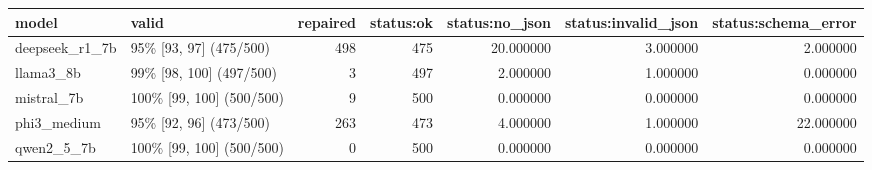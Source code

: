 \begin{tabular}{llrrrrr}
\toprule
model & valid & repaired & status:ok & status:no\_json & status:invalid\_json & status:schema\_error \\
\midrule
deepseek\_r1\_7b & 95\% [93, 97] (475/500) & 498 & 475 & 20.000000 & 3.000000 & 2.000000 \\
llama3\_8b & 99\% [98, 100] (497/500) & 3 & 497 & 2.000000 & 1.000000 & 0.000000 \\
mistral\_7b & 100\% [99, 100] (500/500) & 9 & 500 & 0.000000 & 0.000000 & 0.000000 \\
phi3\_medium & 95\% [92, 96] (473/500) & 263 & 473 & 4.000000 & 1.000000 & 22.000000 \\
qwen2\_5\_7b & 100\% [99, 100] (500/500) & 0 & 500 & 0.000000 & 0.000000 & 0.000000 \\
\bottomrule
\end{tabular}
